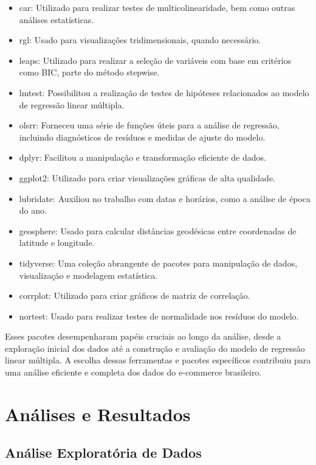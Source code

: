\documentclass[
]{article}
\providecommand{\tightlist}{%
  \setlength{\itemsep}{0pt}\setlength{\parskip}{0pt}}
\begin{document}
\begin{itemize}
\tightlist
\item
  car: Utilizado para realizar testes de multicolinearidade, bem como
  outras análises estatísticas.
\item
  rgl: Usado para visualizações tridimensionais, quando necessário.
\item
  leaps: Utilizado para realizar a seleção de variáveis com base em
  critérios como BIC, parte do método stepwise.
\item
  lmtest: Possibilitou a realização de testes de hipóteses relacionados
  ao modelo de regressão linear múltipla.
\item
  olsrr: Forneceu uma série de funções úteis para a análise de
  regressão, incluindo diagnósticos de resíduos e medidas de ajuste do
  modelo.
\item
  dplyr: Facilitou a manipulação e transformação eficiente de dados.
\item
  ggplot2: Utilizado para criar visualizações gráficas de alta
  qualidade.
\item
  lubridate: Auxiliou no trabalho com datas e horários, como a análise
  de época do ano.
\item
  geosphere: Usado para calcular distâncias geodésicas entre coordenadas
  de latitude e longitude.
\item
  tidyverse: Uma coleção abrangente de pacotes para manipulação de
  dados, visualização e modelagem estatística.
\item
  corrplot: Utilizado para criar gráficos de matriz de correlação.
\item
  nortest: Usado para realizar testes de normalidade nos resíduos do
  modelo.
\end{itemize}

Esses pacotes desempenharam papéis cruciais ao longo da análise, desde a
exploração inicial dos dados até a construção e avaliação do modelo de
regressão linear múltipla. A escolha dessas ferramentas e pacotes
específicos contribuiu para uma análise eficiente e completa dos dados
do e-commerce brasileiro.

\hypertarget{anuxe1lises-e-resultados}{%
\section{Análises e Resultados}\label{anuxe1lises-e-resultados}}

\hypertarget{anuxe1lise-exploratuxf3ria-de-dados}{%
\subsection{Análise Exploratória de
Dados}\label{anuxe1lise-exploratuxf3ria-de-dados}}
\end{document}
